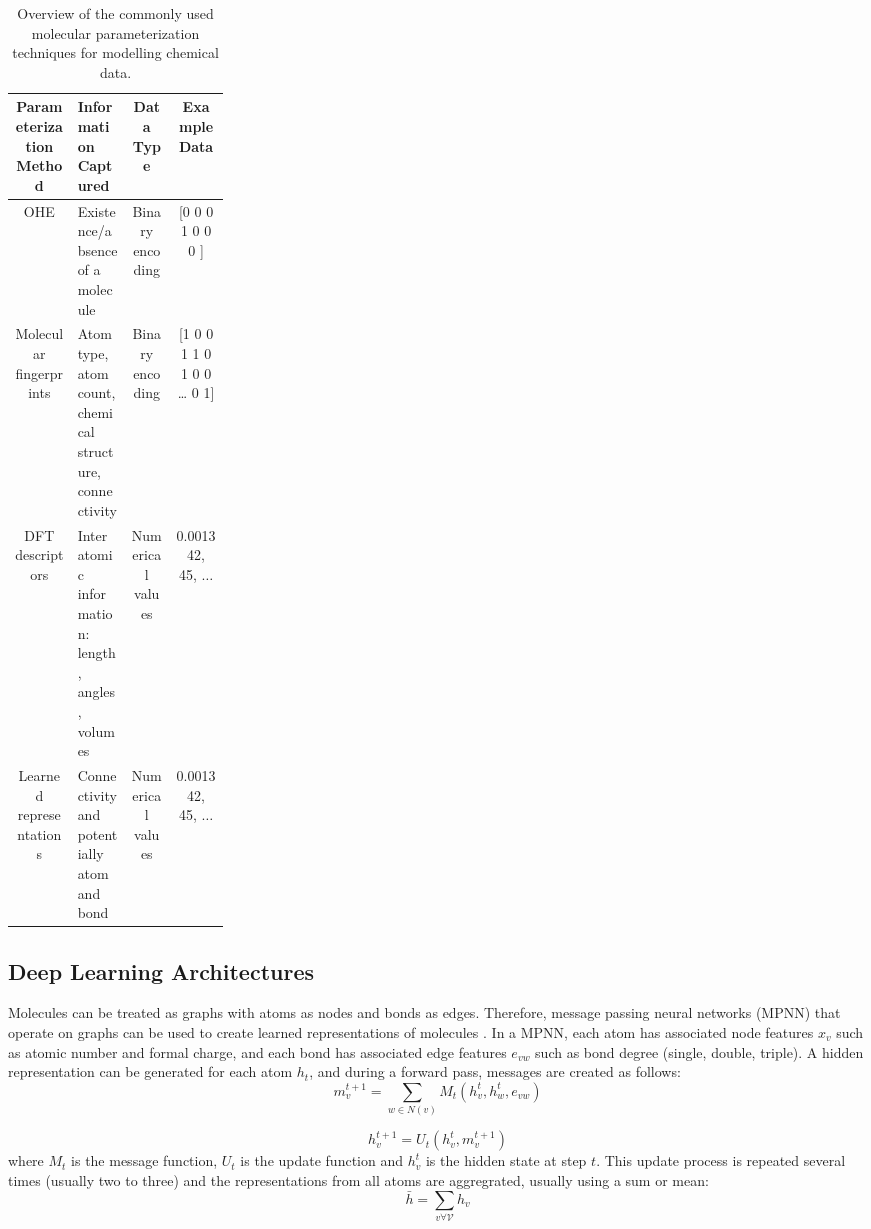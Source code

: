 \begin{table}
    \caption{Overview of the commonly used molecular parameterization techniques for modelling chemical data.}
    \begin{tabular}{cp{0.25\linewidth}cc}
         Parameterization
    Method & Information Captured & Data Type & Example Data  \\
        \hline
         OHE & Existence/absence of a molecule & Binary encoding & [0 0 0 1 0 0 0 ] \\
         Molecular fingerprints & Atom type, atom count, chemical structure, connectivity & Binary encoding & [1 0 0 1 1 0 1 0 0 … 0 1] \\
         DFT descriptors & Inter atomic information: length, angles, volumes &  Numerical values & 0.001342, 45, $\dots$ \\
         Learned representations & Connectivity and potentially atom and bond & Numerical values & 0.001342, 45, $\dots$
    \end{tabular}
    \label{tab:parameterization}
\end{table}

\subsection{Deep Learning Architectures}

Molecules can be treated as graphs with atoms as nodes and bonds as edges. Therefore, message passing neural networks (MPNN) that operate on graphs can be used to create learned representations of molecules \cite{Gilmer2017}.  In a MPNN, each atom has associated node features $x_v$ such as atomic number and formal charge, and each bond has associated edge features $e_{vw}$ such as bond degree (single, double, triple). A hidden representation can be generated for each atom $h_t$, and  during a forward pass, messages are created as follows:
\begin{equation}
    m_v^{t+1} = \sum_{w\in N(v)} M_t(h_v^t, h_w^t, e_{vw})
\end{equation}

\begin{equation}
    h_v^{t+1} = U_t(h_v^t, m_v^{t+1})
\end{equation}
where $M_t$ is the message function, $U_t$ is the update function and $h_v^{t}$ is the hidden state at step $t$. This update process is repeated several times (usually two to three) and the representations from all atoms are aggregrated, usually using a sum or mean:
\begin{equation}
    \bar h = \sum_{v\forall \mathcal V} h_v
\end{equation}

